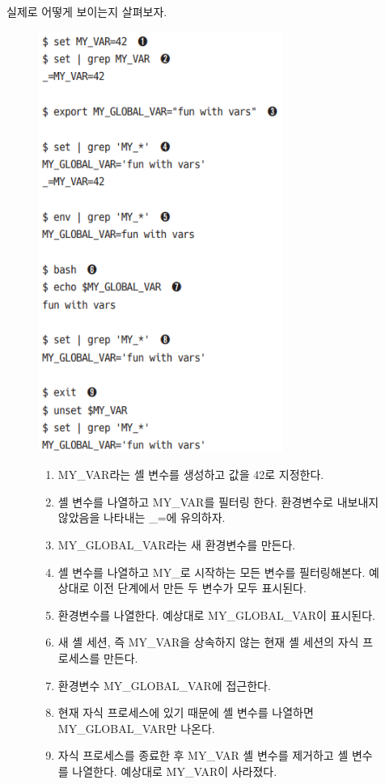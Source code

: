 \begin{flushleft}
    실제로 어떻게 보이는지 살펴보자.
\end{flushleft}

\begin{figure}[H]
    \includegraphics[width=8cm]{resource/3-variable}
    \label{fig:variable}
    \begin{enumerate}
        \item MY\_VAR라는 셸 변수를 생성하고 값을 42로 지정한다.
        \item 셸 변수를 나열하고 MY\_VAR를 필터링 한다.
            환경변수로 내보내지 않았음을 나타내는 \_=에 유의하자.
        \item MY\_GLOBAL\_VAR라는 새 환경변수를 만든다.
        \item 셸 변수를 나열하고 MY\_로 시작하는 모든 변수를 필터링해본다.
            예상대로 이전 단계에서 만든 두 변수가 모두 표시된다.
        \item 환경변수를 나열한다. 예상대로 MY\_GLOBAL\_VAR이 표시된다.
        \item 새 셸 세션,
            즉 MY\_VAR을 상속하지 않는 현재 셸 세션의 자식 프로세스를 만든다.
        \item 환경변수 MY\_GLOBAL\_VAR에 접근한다.
        \item 현재 자식 프로세스에 있기 때문에 셸 변수를 나열하면
            MY\_GLOBAL\_VAR만 나온다.
        \item 자식 프로세스를 종료한 후 MY\_VAR 셸 변수를 제거하고 셸 변수를 나열한다.
            예상대로 MY\_VAR이 사라졌다.
    \end{enumerate}
\end{figure}

